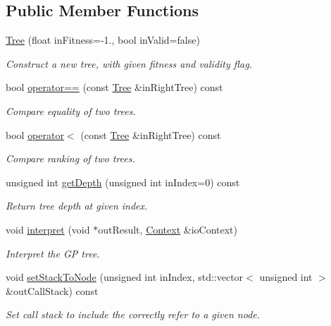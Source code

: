 \subsection*{Public Member Functions}
\begin{DoxyCompactItemize}
\item 
\hyperlink{classPuppy_1_1Tree_ac3a0b230da2e70ecbd801dc1508a3663}{Tree} (float in\+Fitness=-\/1., bool in\+Valid=false)
\begin{DoxyCompactList}\small\item\em Construct a new tree, with given fitness and validity flag. \end{DoxyCompactList}\item 
bool \hyperlink{classPuppy_1_1Tree_a51989208ace756d41a16e8eb35d03cb5}{operator==} (const \hyperlink{classPuppy_1_1Tree}{Tree} \&in\+Right\+Tree) const 
\begin{DoxyCompactList}\small\item\em Compare equality of two trees. \end{DoxyCompactList}\item 
bool \hyperlink{classPuppy_1_1Tree_a60a5ef4dc1298a93810f065a5fffc906}{operator$<$} (const \hyperlink{classPuppy_1_1Tree}{Tree} \&in\+Right\+Tree) const 
\begin{DoxyCompactList}\small\item\em Compare ranking of two trees. \end{DoxyCompactList}\item 
unsigned int \hyperlink{classPuppy_1_1Tree_aa5979533de55c89eb808a69288db5a1b}{get\+Depth} (unsigned int in\+Index=0) const 
\begin{DoxyCompactList}\small\item\em Return tree depth at given index. \end{DoxyCompactList}\item 
void \hyperlink{classPuppy_1_1Tree_aa9e48062cd1ee1d9c8dca83686f35fb1}{interpret} (void $\ast$out\+Result, \hyperlink{classPuppy_1_1Context}{Context} \&io\+Context)
\begin{DoxyCompactList}\small\item\em Interpret the G\+P tree. \end{DoxyCompactList}\item 
void \hyperlink{classPuppy_1_1Tree_a23ae7305ae065dfccf354b3d4ba306c7}{set\+Stack\+To\+Node} (unsigned int in\+Index, std\+::vector$<$ unsigned int $>$ \&out\+Call\+Stack) const 
\begin{DoxyCompactList}\small\item\em Set call stack to include the correctly refer to a given node. \end{DoxyCompactList}\item 

\end{DoxyCompactItemize}
